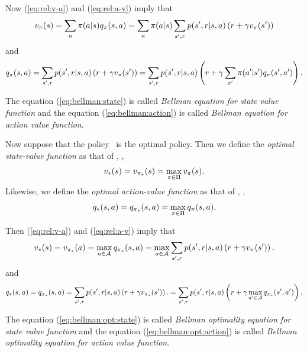 Now (\ref{eq:rel:v-a}) and (\ref{eq:rel:a-v}) imply that
\begin{equation}
\label{eq:bellman:state}
v_{\pi}(s)
= \sum_a \pi(a|s) q_{\pi}(s,a)
= \sum_a \pi(a|s) \sum_{{s'}, r} p({s'}, r|s,a) \left( r + \gamma v_{\pi}({s'}) \right)
\end{equation}
and
\begin{equation}
\label{eq:bellman:action}
q_{\pi}(s,a)
= \sum_{{s'}, r} p({s'}, r|s,a) \left( r + \gamma v_{\pi}({s'}) \right)
= \sum_{{s'}, r} p({s'}, r|s,a) \left( r + \gamma \sum_{a'} \pi({a'}|{s'}) q_{\pi}({s'},{a'}) \right).
\end{equation}

The equation (\ref{eq:bellman:state}) is called \emph{Bellman equation for state value function}
and the equation (\ref{eq:bellman:action}) is called \emph{Bellman equation for action value function}.

Now suppose that the policy \optpol\ is the optimal policy.
Then we define the \emph{optimal state-value function}
as that of \optpol, \ie,
\begin{equation}
v_\ast(s) = v_{{\pi}_\ast}(s) = \max_{\pi\in\Pi} v_{\pi}(s).
\end{equation}
Likewise,
we define the \emph{optimal action-value function}
as that of \optpol, \ie,
\begin{equation}
q_\ast(s,a) = q_{{\pi}_\ast}(s,a) = \max_{\pi\in\Pi} q_{\pi}(s,a).
\end{equation}

Then (\ref{eq:rel:v-a}) and (\ref{eq:rel:a-v}) imply that
\begin{equation}
\label{eq:bellman:opt:state}
v_\ast(s) = v_{{\pi}_\ast}(a) = \max_{a\in\mathcal{A}} q_{{\pi}_\ast}(s,a)
= \max_{a\in\mathcal{A}} \sum_{{s'}, r} p({s'}, r|s,a) \left( r + \gamma v_{\pi}({s'}) \right).
\end{equation}
and
\begin{equation}
\label{eq:bellman:opt:action}
q_\ast(s,a)
= q_{{\pi}_\ast}(s,a)
= \sum_{{s'}, r} p({s'}, r|s,a) \left( r + \gamma v_{{\pi}_\ast}({s'}) \right).
= \sum_{{s'}, r} p({s'}, r|s,a) \left( r + \gamma \max_{{a'}\in\mathcal{A}}q_{{\pi}_\ast}({s'}, {a'}) \right).
\end{equation}

The equation (\ref{eq:bellman:opt:state}) is called \emph{Bellman optimality equation for state value function}
and the equation (\ref{eq:bellman:opt:action}) is called \emph{Bellman optimality equation for action value function}.


